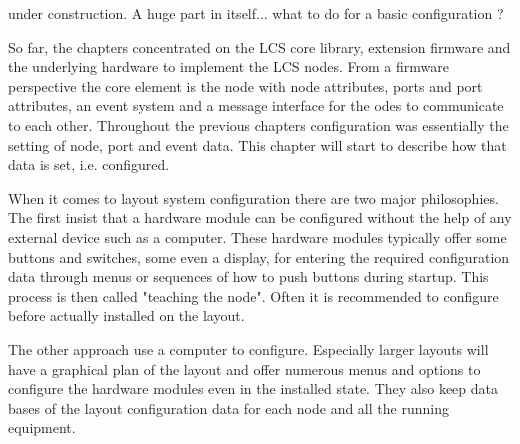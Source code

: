 
under construction. A huge part in itself... what to do for a basic configuration ?

So far, the chapters concentrated on the LCS core library, extension firmware and the underlying hardware to implement the LCS nodes. From a firmware perspective the core element is the node with node attributes, ports and port attributes, an event system and a message interface for the odes to communicate to each other. Throughout the previous chapters configuration was essentially the setting of node, port and event data. This chapter will start to describe how that data is set, i.e. configured.

When it comes to layout system configuration there are two major philosophies. The first insist that a hardware module can be configured without the help of any external device such as a computer. These hardware modules typically offer some buttons and switches, some even a display, for entering the required configuration data through menus or sequences of how to push buttons during startup. This process is then called "teaching the node". Often it is recommended to configure before actually installed on the layout.

The other approach use a computer to configure. Especially larger layouts will have a graphical plan of the layout and offer numerous menus and options to configure the hardware modules even in the installed state. They also keep data bases of the layout configuration data for each node and all the running equipment.



